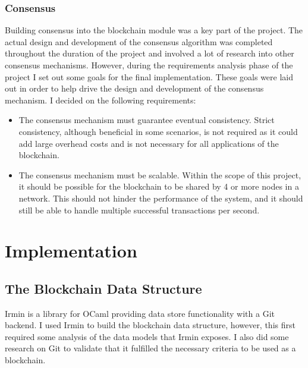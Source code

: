 \documentclass[12pt,a4paper,twoside,openright]{report}
\begin{document}
	\subsection*{Consensus}
	Building consensus into the blockchain module was a key part of the project. 
	The actual design and development of the consensus algorithm was completed throughout the duration of the project and involved a lot of research into other consensus mechanisms.
	However, during the requirements analysis phase of the project I set out some goals for the final implementation.
	These goals were laid out in order to help drive the design and development of the consensus mechanism. 
	I decided on the following requirements:
	\begin{itemize}
		\item The consensus mechanism must guarantee eventual consistency. Strict consistency, although beneficial in some scenarios, is not required as it could add large overhead costs and is not necessary for all applications of the blockchain.
		\item The consensus mechanism must be scalable. Within the scope of this project, it should be possible for the blockchain to be shared by 4 or more nodes in a network. This should not hinder the performance of the system, and it should still be able to handle multiple successful transactions per second.
	\end{itemize}

	\chapter{Implementation} \label{Implementation}
	\section{The Blockchain Data Structure}
	Irmin is a library for OCaml providing data store functionality with a Git backend. 
	I used Irmin to build the blockchain data structure, however, this first required some analysis of the data models that Irmin exposes.
	I also did some research on Git to validate that it fulfilled the necessary criteria to be used as a blockchain.
\end{document}
